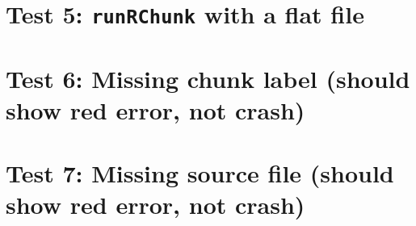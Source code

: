 \documentclass[12pt]{article}
\begin{document}

\section*{Test 5: \texttt{runRChunk} with a flat file}


\section*{Test 6: Missing chunk label (should show red error, not crash)}


\section*{Test 7: Missing source file (should show red error, not crash)}

\end{document}
